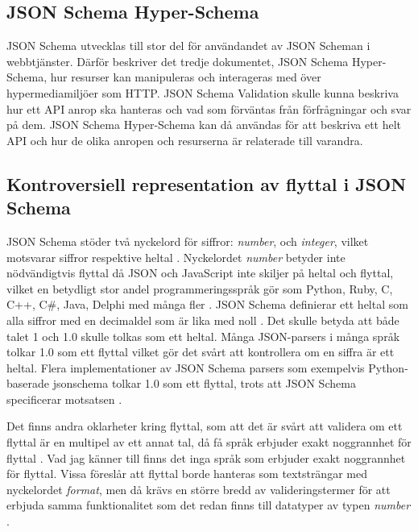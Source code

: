 \subsection{JSON Schema Hyper-Schema}
JSON Schema utvecklas till stor del för användandet av JSON Scheman i webbtjänster. Därför beskriver det tredje dokumentet, JSON Schema Hyper-Schema, hur resurser kan manipuleras och interageras med över hypermediamiljöer som HTTP. JSON Schema Validation skulle kunna beskriva hur ett API anrop ska hanteras och vad som förväntas från förfrågningar och svar på dem. JSON Schema Hyper-Schema kan då användas för att beskriva ett helt API och hur de olika anropen och resurserna är relaterade till varandra. \cite{Andrews2018a}

\subsection{Kontroversiell representation av flyttal i JSON Schema}
\label{sec:teori:schema:float}

JSON Schema stöder två nyckelord för siffror: \textit{number}, och \textit{integer}, vilket motsvarar siffror respektive heltal \cite{Andrews}. Nyckelordet \textit{number} betyder inte nödvändigtvis flyttal då JSON och JavaScript inte skiljer på heltal och flyttal, vilket en betydligt stor andel programmeringsspråk gör som Python, Ruby, C, C++, C\#, Java, Delphi med många fler \cite{Embarcadero,Oracle,Microsofta,GNU,GNUa,Britt,Britta,PythonSoftwareFoundation2018,ECMA2013,EcmaInternational2017}. JSON Schema definierar ett heltal som alla siffror med en decimaldel som är lika med noll \cite{Andrews}. Det skulle betyda att både talet 1 och 1.0 skulle tolkas som ett heltal. Många JSON-parsers i många språk tolkar 1.0 som ett flyttal vilket gör det svårt att kontrollera om en siffra är ett heltal. Flera implementationer av JSON Schema parsers som exempelvis Python-baserade jsonschema tolkar 1.0 som ett flyttal, trots att JSON Schema specificerar motsatsen \cite{SpaceTelescopeScienceInstitute2016}.

Det finns andra oklarheter kring flyttal, som att det är svårt att validera om ett flyttal är en multipel av ett annat tal, då få språk erbjuder exakt noggrannhet för flyttal \cite{Cederqvist2017}. Vad jag känner till finns det inga språk som erbjuder exakt noggrannhet för flyttal. Vissa föreslår att flyttal borde hanteras som textsträngar med nyckelordet \textit{format}, men då krävs en större bredd av valideringstermer för att erbjuda samma funktionalitet som det redan finns till datatyper av typen \textit{number} \cite{Poberezkin,Faassen}.

